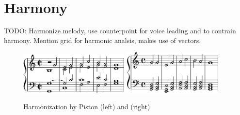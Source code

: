\newcommand{\Harmonization}{
  \begin{figure}
    \includegraphics[width=5.5cm]{fig/piston.png}
    \hspace{1cm}
    \includegraphics[width=5cm]{fig/fharm.png}
    \caption{Harmonization by Piston (left) and \fharm (right)}
    \label{fig:harmonization}
  \end{figure}
}

\section{Harmony}
\label{sec:harmony}

TODO: Harmonize melody, use counterpoint for voice leading and to contrain harmony.
Mention grid for harmonic analsis, makes use of vectors.

\Harmonization
